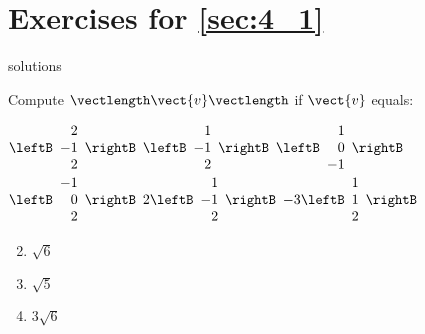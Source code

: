 \section*{Exercises for \ref{sec:4_1}}

\begin{Filesave}{solutions}
\end{Filesave}

\begin{multicols}{2}
\begin{ex}
Compute $\vectlength\vect{v}\vectlength$ if $\vect{v}$ equals:

\begin{exenumerate}[column-sep=-5em]
\exitem $\leftB
\begin{array}{r}
2 \\
-1 \\
2
\end{array}
\rightB$ 
\exitem $\leftB
\begin{array}{r}
1 \\
-1 \\
2
\end{array}
\rightB$
\exitem $\leftB
\begin{array}{r}
1 \\
0 \\
-1
\end{array}
\rightB$
\exitem $\leftB
\begin{array}{r}
-1 \\
0 \\
2
\end{array}
\rightB$
\exitem $2\leftB
\begin{array}{r}
1 \\
-1 \\
2
\end{array}
\rightB$
\exitem $-3\leftB
\begin{array}{r}
1 \\
1 \\
2
\end{array}
\rightB$
\end{exenumerate}
\begin{sol}
\begin{enumerate}[label={\alph*.}]
\setcounter{enumi}{1}
\item $\sqrt{6}$ 

\setcounter{enumi}{3}
\item $\sqrt{5}$

\setcounter{enumi}{5}
\item $3\sqrt{6}$



\end{enumerate}
\end{sol}
\end{ex}
\end{multicols}
